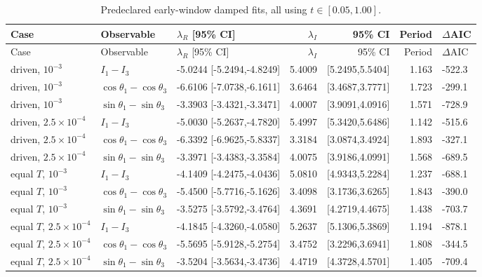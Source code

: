 \begin{longtable}{lllrrrl}
\caption{Predeclared early-window damped fits, all using $t\in[0.05,1.00]$.}\label{tab:odd}\\
\toprule Case & Observable & $\lambda_R$ [95\% CI] & $\lambda_I$ & 95\% CI & Period & $\Delta$AIC\\\midrule\endfirsthead
\toprule Case & Observable & $\lambda_R$ [95\% CI] & $\lambda_I$ & 95\% CI & Period & $\Delta$AIC\\\midrule\endhead
driven, $10^{-3}$ & $I_1-I_3$ & -5.0244 [-5.2494,-4.8249] & 5.4009 & [5.2495,5.5404] & 1.163 & -522.3 \\
driven, $10^{-3}$ & $\cos\theta_1-\cos\theta_3$ & -6.6106 [-7.0738,-6.1611] & 3.6464 & [3.4687,3.7771] & 1.723 & -299.1 \\
driven, $10^{-3}$ & $\sin\theta_1-\sin\theta_3$ & -3.3903 [-3.4321,-3.3471] & 4.0007 & [3.9091,4.0916] & 1.571 & -728.9 \\
driven, $2.5\!\times\!10^{-4}$ & $I_1-I_3$ & -5.0030 [-5.2637,-4.7820] & 5.4997 & [5.3420,5.6486] & 1.142 & -515.6 \\
driven, $2.5\!\times\!10^{-4}$ & $\cos\theta_1-\cos\theta_3$ & -6.3392 [-6.9625,-5.8337] & 3.3184 & [3.0874,3.4924] & 1.893 & -327.1 \\
driven, $2.5\!\times\!10^{-4}$ & $\sin\theta_1-\sin\theta_3$ & -3.3971 [-3.4383,-3.3584] & 4.0075 & [3.9186,4.0991] & 1.568 & -689.5 \\
equal $T$, $10^{-3}$ & $I_1-I_3$ & -4.1409 [-4.2475,-4.0436] & 5.0810 & [4.9343,5.2284] & 1.237 & -688.1 \\
equal $T$, $10^{-3}$ & $\cos\theta_1-\cos\theta_3$ & -5.4500 [-5.7716,-5.1626] & 3.4098 & [3.1736,3.6265] & 1.843 & -390.0 \\
equal $T$, $10^{-3}$ & $\sin\theta_1-\sin\theta_3$ & -3.5275 [-3.5792,-3.4764] & 4.3691 & [4.2719,4.4675] & 1.438 & -703.7 \\
equal $T$, $2.5\!\times\!10^{-4}$ & $I_1-I_3$ & -4.1845 [-4.3260,-4.0580] & 5.2637 & [5.1306,5.3869] & 1.194 & -878.1 \\
equal $T$, $2.5\!\times\!10^{-4}$ & $\cos\theta_1-\cos\theta_3$ & -5.5695 [-5.9128,-5.2754] & 3.4752 & [3.2296,3.6941] & 1.808 & -344.5 \\
equal $T$, $2.5\!\times\!10^{-4}$ & $\sin\theta_1-\sin\theta_3$ & -3.5204 [-3.5634,-3.4736] & 4.4719 & [4.3728,4.5701] & 1.405 & -709.4 \\
\bottomrule\end{longtable}

